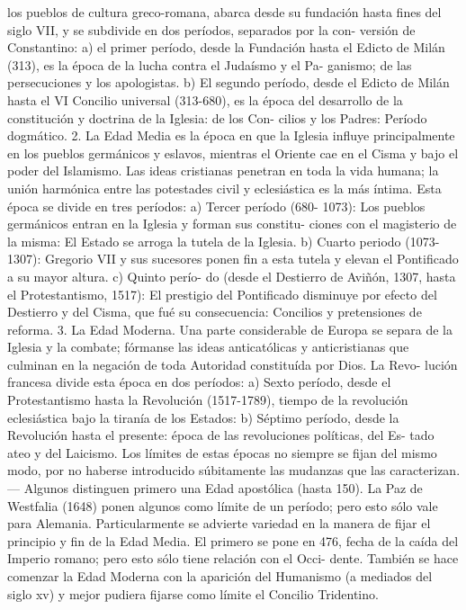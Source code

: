 \raggedbottom{} \documentclass[12pt]{book}
\begin{document}
los pueblos de cultura greco-romana, abarca desde su fundación hasta
fines del siglo VII, y se subdivide en dos períodos, separados por la con-
versión de Constantino: a) el primer período, desde la Fundación hasta el
Edicto de Milán (313), es la época de la lucha contra el Judaísmo y el Pa-
ganismo; de las persecuciones y los apologistas. b) El segundo período,
desde el Edicto de Milán hasta el VI Concilio universal (313-680), es la
época del desarrollo de la constitución y doctrina de la Iglesia: de los Con-
cilios y los Padres: Período dogmático.
2. La Edad Media es la época en que la Iglesia influye principalmente
en los pueblos germánicos y eslavos, mientras el Oriente cae en el Cisma
y bajo el poder del Islamismo. Las ideas cristianas penetran en toda la vida
humana; la unión harmónica entre las potestades civil y eclesiástica es la
más íntima. Esta época se divide en tres períodos: a) Tercer período (680-
1073): Los pueblos germánicos entran en la Iglesia y forman sus constitu-
ciones con el magisterio de la misma: El Estado se arroga la tutela de la
Iglesia. b) Cuarto periodo (1073-1307): Gregorio VII y sus sucesores ponen
fin a esta tutela y elevan el Pontificado a su mayor altura. c) Quinto perío-
do (desde el Destierro de Aviñón, 1307, hasta el Protestantismo, 1517): El
prestigio del Pontificado disminuye por efecto del Destierro y del Cisma,
que fué su consecuencia: Concilios y pretensiones de reforma.
3. La Edad Moderna. Una parte considerable de Europa se separa de
la Iglesia y la combate; fórmanse las ideas anticatólicas y anticristianas que
culminan en la negación de toda Autoridad constituída por Dios. La Revo-
lución francesa divide esta época en dos períodos: a) Sexto período, desde
el Protestantismo hasta la Revolución (1517-1789), tiempo de la revolución
eclesiástica bajo la tiranía de los Estados: b) Séptimo período, desde la
Revolución hasta el presente: época de las revoluciones políticas, del Es-
tado ateo y del Laicismo.
Los límites de estas épocas no siempre se fijan del mismo modo, por no
haberse introducido súbitamente las mudanzas que las caracterizan.—
Algunos distinguen primero una Edad apostólica (hasta 150). La Paz de
Westfalia (1648) ponen algunos como límite de un período; pero esto sólo
vale para Alemania. Particularmente se advierte variedad en la manera de
fijar el principio y fin de la Edad Media. El primero se pone en 476, fecha
de la caída del Imperio romano; pero esto sólo tiene relación con el Occi-
dente. También se hace comenzar la Edad Moderna con la aparición del
Humanismo (a mediados del siglo xv) y mejor pudiera fijarse como límite
el Concilio Tridentino.
\end{document}
